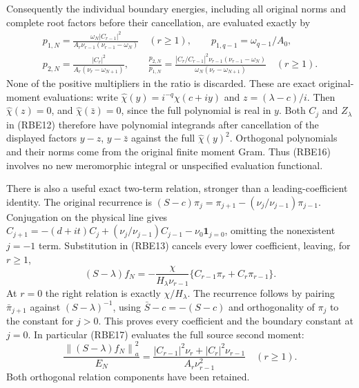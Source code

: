 \documentclass[11pt]{article}
\newcommand{\norm}[1]{\left\lVert#1\right\rVert}
\begin{document}
Consequently the individual boundary energies, including all
original norms and complete root factors before their cancellation,
are evaluated exactly by
\begin{equation}\tag{RBE16}
 \begin{gathered}
 p_{1,N}=\frac{\omega_N|C_{r-1}|^2}
 {A_r\nu_{r-1}(\nu_{r-1}-\omega_N)}\quad(r\ge1),\qquad
 p_{1,q-1}=\omega_{q-1}/A_0,\\
 p_{2,N}=\frac{|C_r|^2}{A_r(\nu_r-\omega_{N+1})},\qquad
 \frac{p_{2,N}}{p_{1,N}}
 =\frac{|C_r/C_{r-1}|^2\nu_{r-1}(\nu_{r-1}-\omega_N)}
 {\omega_N(\nu_r-\omega_{N+1})}\quad(r\ge1).
 \end{gathered}
\end{equation}
None of the positive multipliers in the ratio is discarded.
These are exact original-moment evaluations: write
\(\widehat\chi(y)=i^{-q}\chi(c+iy)\) and
\(z=(\lambda-c)/i\). Then \(\widehat\chi(z)=0\), and
\(\widehat\chi(\bar z)=0\), since the full polynomial is
real in \(y\). Both \(C_j\) and \(Z_\lambda\) in (RBE12)
therefore have polynomial integrands after cancellation of the
displayed factors \(y-z\), \(y-\bar z\) against the full
\(\widehat\chi(y)^2\). Orthogonal polynomials and their norms
come from the original finite moment Gram. Thus (RBE16) involves
no new meromorphic integral or unspecified evaluation functional.

There is also a useful exact two-term relation, stronger than a
leading-coefficient identity. The original recurrence is
\((S-c)\pi_j=\pi_{j+1}-(\nu_j/\nu_{j-1})\pi_{j-1}\).
Conjugation on the physical line gives
\(C_{j+1}=-(d+it)C_j+(\nu_j/\nu_{j-1})C_{j-1}
-\nu_0\mathbf1_{j=0}\), omitting the nonexistent \(j=-1\)
term. Substitution in (RBE13) cancels every lower coefficient,
leaving, for \(r\ge1\),
\begin{equation}\tag{RBE17}
 (S-\lambda)f_N
 =-\frac{\chi}{H_\lambda\nu_{r-1}}
        \{C_{r-1}\pi_r+C_r\pi_{r-1}\}.
\end{equation}
At \(r=0\) the right relation is exactly \(\chi/H_\lambda\).
The recurrence follows by pairing \(\bar\pi_{j+1}\) against
\((S-\lambda)^{-1}\), using \(\bar S-c=-(S-c)\) and
orthogonality of \(\pi_j\) to the constant for \(j>0\).
This proves every coefficient and the boundary constant at \(j=0\).
In particular (RBE17) evaluates the full source second moment:
\begin{equation}\tag{RBE18}
 \frac{\norm{(S-\lambda)f_N}_a^2}{E_N}
 =\frac{|C_{r-1}|^2\nu_r+|C_r|^2\nu_{r-1}}
        {A_r\nu_{r-1}^2}\quad(r\ge1).
\end{equation}
Both orthogonal relation components have been retained.
\end{document}
